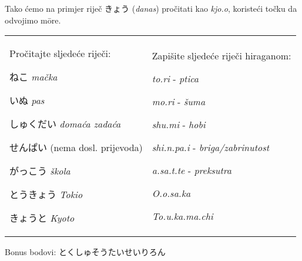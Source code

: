 	\vspace{5pt}
	Tako ćemo na primjer riječ きょう (\textit{danas}) pročitati kao \textit{kjo.o}, koristeći točku da odvojimo m\={o}re.
	
	
	\begin{tabular}{p{200pt} p{200pt}}
		\begin{mondai}{Pročitajte sljedeće riječi:}
			\item ねこ \textit{mačka}
			\item いぬ \textit{pas}
			\item しゅくだい \textit{domaća zadaća}
			\item せんぱい (nema dosl. prijevoda)
			\item がっこう \textit{škola}
			\item とうきょう \textit{Tokio}
			\item きょうと \textit{Kyoto}
		\end{mondai}
		&
		\begin{mondai}{Zapišite sljedeće riječi hiraganom:}
			\item \textit{to.ri} - \textit{ptica}
			\item \textit{mo.ri} - \textit{šuma}
			\item \textit{shu.mi} - \textit{hobi}
			\item \textit{shi.n.pa.i} - \textit{briga/zabrinutost}
			\item \textit{a.sa.t.te} - \textit{preksutra}
			\item \textit{O.o.sa.ka}
			\item \textit{To.u.ka.ma.chi}
		\end{mondai}\\
	\end{tabular}
	
	Bonus bodovi: とくしゅそうたいせいりろん
	
